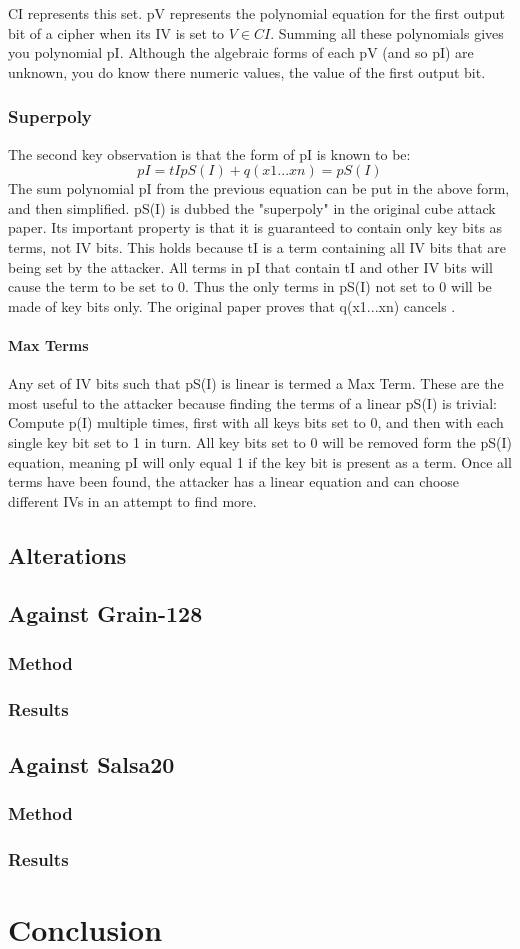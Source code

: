 \documentclass{report}
\begin{document}
CI represents this set. pV represents the polynomial equation for the first output bit of a cipher when its IV is set to $V \in CI$. Summing all these polynomials gives you polynomial pI. Although the algebraic forms of each pV (and so pI) are unknown, you do know there numeric values, the value of the first output bit.
\subsection{Superpoly}
The second key observation is that the form of pI is known to be:
\begin{equation} \label{eq:GFpowers}
pI = tIpS(I)+q(x1...xn)=pS(I)
\end{equation}
The sum polynomial pI from the previous equation can be put in the above form, and then simplified.
pS(I) is dubbed the "superpoly" in the original cube attack paper. Its important property is that it is guaranteed to contain only key bits as terms, not IV bits. This holds because tI is a term containing all IV bits that are being set by the attacker. All terms in pI that contain tI and other IV bits will cause the term to be set to 0. Thus the only terms in pS(I) not set to 0 will be made of key bits only. The original paper proves that q(x1...xn) cancels \cite{DinurShamir2009}.
\subsubsection{Max Terms}
Any set of IV bits such that pS(I) is linear is termed a Max Term. These are the most useful to the attacker because finding the terms of a linear pS(I) is trivial: Compute p(I) multiple times, first with all keys bits set to 0, and then with each single key bit set to 1 in turn. All key bits set to 0 will be removed form the pS(I) equation, meaning pI will only equal 1 if the key bit is present as a term. Once all terms have been found, the attacker has a linear equation and can choose different IVs in an attempt to find more.
\section{Alterations}
\section{Against Grain-128}
\subsection{Method}
\subsection{Results}
\section{Against Salsa20}
\subsection{Method}
\subsection{Results}
\chapter{Conclusion}


\end{document}
